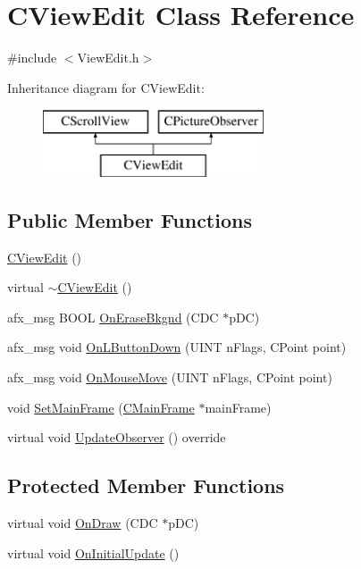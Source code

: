 \hypertarget{class_c_view_edit}{}\section{C\+View\+Edit Class Reference}
\label{class_c_view_edit}


{\ttfamily \#include $<$View\+Edit.\+h$>$}

Inheritance diagram for C\+View\+Edit\+:\begin{figure}[H]
\begin{center}
\leavevmode
\includegraphics[height=2.000000cm]{class_c_view_edit}
\end{center}
\end{figure}
\subsection*{Public Member Functions}
\begin{DoxyCompactItemize}
\item 
\hyperlink{class_c_view_edit_a99fea37450207a1ffe8cf6b46ec2a11f}{C\+View\+Edit} ()
\item 
virtual \hyperlink{class_c_view_edit_a968f16ef61489033c80ebe504017db3a}{$\sim$\+C\+View\+Edit} ()
\item 
afx\+\_\+msg B\+O\+O\+L \hyperlink{class_c_view_edit_a66446b22920245bb3b5c5735754d63cd}{On\+Erase\+Bkgnd} (C\+D\+C $\ast$p\+D\+C)
\item 
afx\+\_\+msg void \hyperlink{class_c_view_edit_a0e77d59dd1ed299c933f660d9ff0cf7e}{On\+L\+Button\+Down} (U\+I\+N\+T n\+Flags, C\+Point point)
\item 
afx\+\_\+msg void \hyperlink{class_c_view_edit_aba0b38ee4b51f9d98bc08ade92d9f051}{On\+Mouse\+Move} (U\+I\+N\+T n\+Flags, C\+Point point)
\item 
void \hyperlink{class_c_view_edit_a28bb793d43baba78e9b1c704b4f0e128}{Set\+Main\+Frame} (\hyperlink{class_c_main_frame}{C\+Main\+Frame} $\ast$main\+Frame)
\item 
virtual void \hyperlink{class_c_view_edit_ac2b73f20fe10a4a98096facde6450e5a}{Update\+Observer} () override
\end{DoxyCompactItemize}
\subsection*{Protected Member Functions}
\begin{DoxyCompactItemize}
\item 
virtual void \hyperlink{class_c_view_edit_a8cf50c2cebab5aaecda5ae6f7437cf38}{On\+Draw} (C\+D\+C $\ast$p\+D\+C)
\item 
virtual void \hyperlink{class_c_view_edit_ac49ed2e9e35cd014c6539aaa4ac705f3}{On\+Initial\+Update} ()
\end{DoxyCompactItemize}


